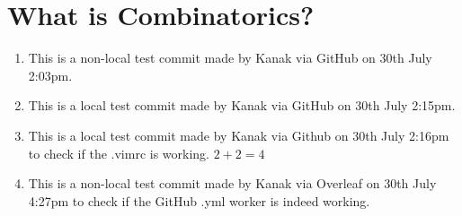 %
%
% 


\chapter{What is Combinatorics?}
\begin{enumerate}
\item This is a non-local test commit made by Kanak via GitHub on 30th July 2:03pm.
\item This is a local test commit made by Kanak via GitHub on 30th July 2:15pm.
\item This is a local test commit made by Kanak via Github on 30th July 2:16pm to check if the .vimrc is working. $2+2=4$
\item This is a non-local test commit made by Kanak via Overleaf on 30th July 4:27pm to check if the GitHub .yml worker is indeed working.
\end{enumerate}















\endinput

